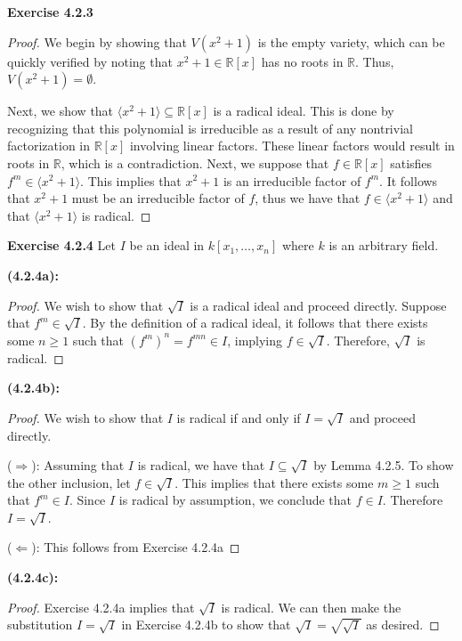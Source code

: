 \documentclass[12pt,oneside]{article}
\newenvironment{exercise}[1]{\vspace{.1in}\noindent\textbf{Exercise #1 \hspace{.05em}}}{}
\newcommand{\R}{\mathbb{R}}
\begin{document}

\begin{exercise}{4.2.3}
    \begin{proof}
        We begin by showing that $V(x^2+1)$ is the empty variety, which can be quickly 
        verified by noting that $x^2+1 \in \R[x]$ has no roots in $\R$. Thus, 
        $V(x^2+1) = \emptyset$.
        
        Next, we show that $\langle x^2+1 \rangle \subseteq \R[x]$ is a radical ideal. This 
        is done by recognizing that this polynomial is irreducible as a result of any 
        nontrivial factorization in $\R[x]$ involving linear factors. These linear 
        factors would result in roots in $\R$, which is a contradiction. Next, we 
        suppose that $f \in \R[x]$ satisfies $f^m \in \langle x^2+1 \rangle$. This 
        implies that $x^2+1$ is an irreducible factor of $f^m$. It follows that 
        $x^2+1$ must be an irreducible factor of $f$, thus we have that 
        $f\in\langle x^2+1\rangle$ and that $\langle x^2+1 \rangle$ is radical.
    \end{proof}
\end{exercise}


\begin{exercise}{4.2.4}
    Let $I$ be an ideal in $k[x_1,\ldots,x_n]$ where $k$ is an arbitrary field.
    
    \bigskip
    \textbf{(4.2.4a):}
    \begin{proof}
        We wish to show that $\sqrt{I}$ is a radical ideal and proceed directly. 
        Suppose that $f^m \in \sqrt{I}$. By the definition of a radical ideal, 
        it follows that there exists some $n \geq 1$ such that $(f^m)^n = f^{mn} \in I$, 
        implying $f \in \sqrt{I}$. Therefore, $\sqrt{I}$ is radical.
    \end{proof}
    
    \newpage
    \textbf{(4.2.4b):}
    \begin{proof}
        We wish to show that $I$ is radical if and only if $I = \sqrt{I}$ and proceed 
        directly.
        
        ($\Rightarrow$): Assuming that $I$ is radical, we have that $I \subseteq \sqrt{I}$ 
        by Lemma 4.2.5. To show the other inclusion, let $f \in \sqrt{I}$. This implies 
        that there exists some $m \geq 1$ such that $f^m \in I$. Since $I$ is radical 
        by assumption, we conclude that $f \in I$. Therefore $I = \sqrt{I}$.
        
        ($\Leftarrow$): This follows from Exercise 4.2.4a
    \end{proof}
    
    \bigskip
    \textbf{(4.2.4c):}
    \begin{proof}
        Exercise 4.2.4a implies that $\sqrt{I}$ is radical. We can then make the 
        substitution $I = \sqrt{I}$ in Exercise 4.2.4b to show that 
        $\sqrt{I} = \sqrt{\sqrt{I}}$ as desired.
    \end{proof}
    
\end{exercise}
\end{document}

